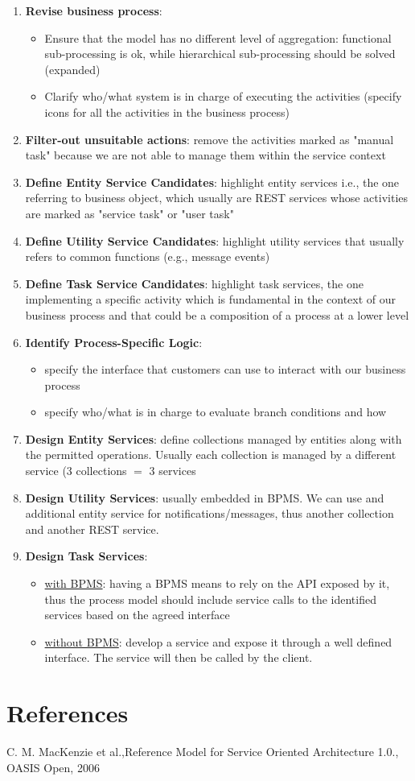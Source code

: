 \documentclass[10pt,a4paper]{article}
\begin{document}
\begin{enumerate}
	\item \textbf{Revise business process}: 
	\begin{itemize}
		\item Ensure that the model has no different level of aggregation: functional sub-processing is ok, while hierarchical sub-processing should be solved (expanded)
		\item Clarify who/what system is in charge of executing the activities (specify icons for all the activities in the business process)
	\end{itemize}
	\item \textbf{Filter-out unsuitable actions}: remove the activities marked as "manual task" because we are not able to manage them within the service context
	\item \textbf{Define Entity Service Candidates}: highlight entity services i.e., the one referring to business object, which usually are REST services whose activities are marked as "service task" or "user task"
	\item \textbf{Define Utility Service Candidates}: highlight utility services that usually refers to common functions (e.g., message events) 
	\item \textbf{Define Task Service Candidates}: highlight task services, the one implementing a specific activity which is fundamental in the context of our business process and that could be a composition of a process at a lower level \pagebreak
	\item \textbf{Identify Process-Specific Logic}: 
	\begin{itemize}
		\item specify the interface that customers can use to interact with our business process
		\item specify who/what is in charge to evaluate branch conditions and how
	\end{itemize}
	\item \textbf{Design Entity Services}: define collections managed by entities along with the permitted operations. Usually each collection is managed by a different service (3 collections $=$ 3 services
	\item \textbf{Design Utility Services}: usually embedded in BPMS. We can use and additional entity service for notifications/messages, thus another collection and another REST service.
	\item \textbf{Design Task Services}: 
	\begin{itemize}
		\item  \uline{with BPMS}: having a BPMS means to rely on the API exposed by it, thus the process model should include service calls to the identified services based on the agreed interface
		\item  \uline{without BPMS}: develop a service and expose it through a well defined interface. The service will then be called by the client. 
\end{itemize}	
\end{enumerate}
\section{\LARGE References}
\begin{enumerate}[label={[\arabic*]}]
  \item C. M. MacKenzie et al.,Reference Model for Service Oriented
Architecture 1.0., OASIS Open, 2006
\end{enumerate}
\end{document}
